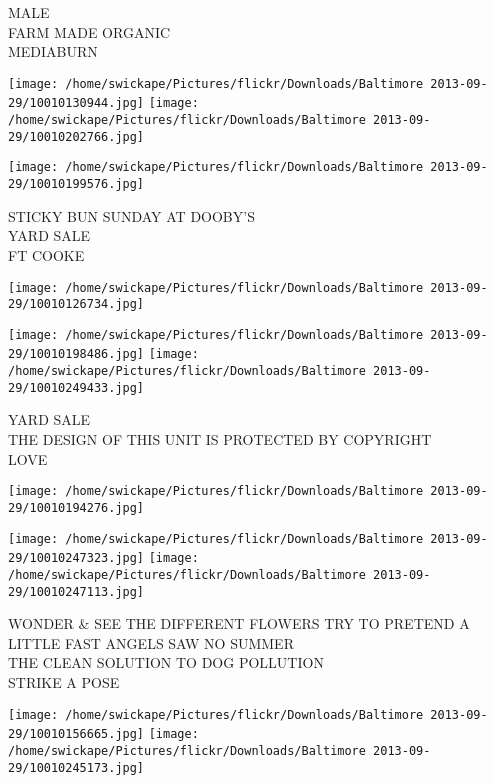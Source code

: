 \documentclass[10pt,letterpaper]{article}
\begin{document}
MALE\\
FARM MADE ORGANIC\\
MEDIABURN\\
\pagebreak

\texttt{[image: /home/swickape/Pictures/flickr/Downloads/Baltimore 2013-09-29/10010130944.jpg]}
\texttt{[image: /home/swickape/Pictures/flickr/Downloads/Baltimore 2013-09-29/10010202766.jpg]}

\texttt{[image: /home/swickape/Pictures/flickr/Downloads/Baltimore 2013-09-29/10010199576.jpg]}

STICKY BUN SUNDAY AT DOOBY'S\\
YARD SALE\\
FT COOKE\\
\pagebreak

\texttt{[image: /home/swickape/Pictures/flickr/Downloads/Baltimore 2013-09-29/10010126734.jpg]}

\vspace{0.25in}
\texttt{[image: /home/swickape/Pictures/flickr/Downloads/Baltimore 2013-09-29/10010198486.jpg]}
\texttt{[image: /home/swickape/Pictures/flickr/Downloads/Baltimore 2013-09-29/10010249433.jpg]}

YARD SALE\\
THE DESIGN OF THIS UNIT IS PROTECTED BY COPYRIGHT\\
LOVE\\
\pagebreak

\texttt{[image: /home/swickape/Pictures/flickr/Downloads/Baltimore 2013-09-29/10010194276.jpg]}

\vspace{0.25in}
\texttt{[image: /home/swickape/Pictures/flickr/Downloads/Baltimore 2013-09-29/10010247323.jpg]}
\texttt{[image: /home/swickape/Pictures/flickr/Downloads/Baltimore 2013-09-29/10010247113.jpg]}

WONDER \& SEE THE DIFFERENT FLOWERS TRY TO PRETEND A LITTLE FAST ANGELS SAW NO SUMMER\\
THE CLEAN SOLUTION TO DOG POLLUTION\\
STRIKE A POSE\\
\pagebreak

\texttt{[image: /home/swickape/Pictures/flickr/Downloads/Baltimore 2013-09-29/10010156665.jpg]}
\texttt{[image: /home/swickape/Pictures/flickr/Downloads/Baltimore 2013-09-29/10010245173.jpg]}
\end{document}
